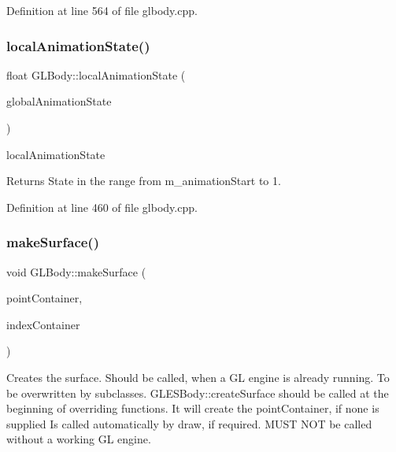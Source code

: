 Definition at line 564 of file glbody.\+cpp.

\mbox{\label{class_g_l_body_a30ff6f538a3966b06b2f07739070d14d}} 
\subsubsection{\texorpdfstring{localAnimationState()}{localAnimationState()}}
{\footnotesize\ttfamily float G\+L\+Body\+::local\+Animation\+State (\begin{DoxyParamCaption}\item[{float}]{global\+Animation\+State }\end{DoxyParamCaption})}



local\+Animation\+State 

\begin{DoxyReturn}{Returns}
State in the range from m\+\_\+animation\+Start to 1. 
\end{DoxyReturn}


Definition at line 460 of file glbody.\+cpp.

\mbox{\label{class_g_l_body_a73e51b159f343d0bda87f50df382b7db}} 
\subsubsection{\texorpdfstring{makeSurface()}{makeSurface()}}
{\footnotesize\ttfamily void G\+L\+Body\+::make\+Surface (\begin{DoxyParamCaption}\item[{Q\+Vector$<$ \mbox{\hyperlink{class_g_l_point}{G\+L\+Point}} $>$ $\ast$}]{point\+Container,  }\item[{Q\+Vector$<$ Index\+Type $>$ $\ast$}]{index\+Container }\end{DoxyParamCaption})\hspace{0.3cm}{\ttfamily [virtual]}}

Creates the surface. Should be called, when a GL engine is already running. To be overwritten by subclasses. G\+L\+E\+S\+Body\+::create\+Surface should be called at the beginning of overriding functions. It will create the point\+Container, if none is supplied Is called automatically by draw, if required. M\+U\+ST N\+OT be called without a working GL engine.


